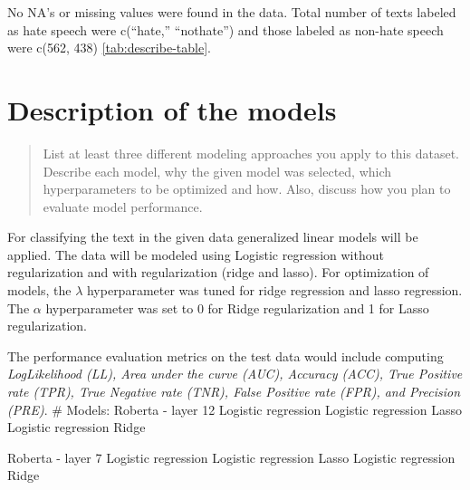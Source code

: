 \documentclass[
  english,
  man]{apa6}
\begin{document}
No NA's or missing values were found in the data. Total number of texts labeled as hate speech were c(``hate,'' ``nothate'') and those labeled as non-hate speech were c(562, 438) \ref{tab:describe-table}.

\hypertarget{description-of-the-models}{%
\section{Description of the models}\label{description-of-the-models}}

\begin{quote}
List at least three different modeling approaches you apply to this dataset. Describe each model, why the given model was selected, which hyperparameters to be optimized and how. Also, discuss how you plan to evaluate model performance.
\end{quote}

For classifying the text in the given data generalized linear models will be applied. The data will be modeled using Logistic regression without regularization and with regularization (ridge and lasso). For optimization of models, the \(\lambda\) hyperparameter was tuned for ridge regression and lasso regression. The \(\alpha\) hyperparameter was set to 0 for Ridge regularization and 1 for Lasso regularization.

The performance evaluation metrics on the test data would include computing \emph{LogLikelihood (LL), Area under the curve (AUC), Accuracy (ACC), True Positive rate (TPR), True Negative rate (TNR), False Positive rate (FPR), and Precision (PRE)}.
\# Models:
Roberta - layer 12
Logistic regression
Logistic regression Lasso
Logistic regression Ridge

Roberta - layer 7
Logistic regression
Logistic regression Lasso
Logistic regression Ridge
\end{document}

